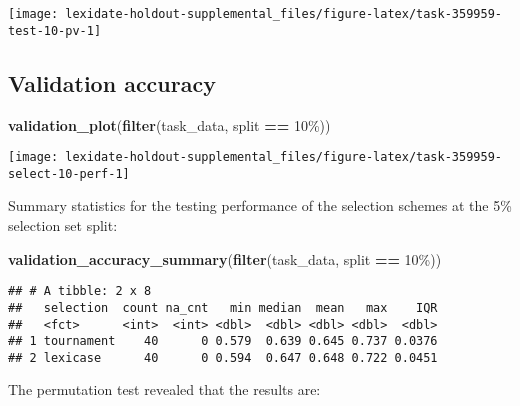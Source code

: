 \documentclass[
]{book}
\newenvironment{Shaded}{\begin{snugshade}}{\end{snugshade}}
\newcommand{\FunctionTok}[1]{\textcolor[rgb]{0.13,0.29,0.53}{\textbf{#1}}}
\newcommand{\NormalTok}[1]{#1}
\newcommand{\SpecialCharTok}[1]{\textcolor[rgb]{0.81,0.36,0.00}{\textbf{#1}}}
\newcommand{\StringTok}[1]{\textcolor[rgb]{0.31,0.60,0.02}{#1}}
\begin{document}
\texttt{[image: lexidate-holdout-supplemental\_files/figure-latex/task-359959-test-10-pv-1]}

\hypertarget{validation-accuracy-36}{%
\subsection{Validation accuracy}\label{validation-accuracy-36}}

\begin{Shaded}
\begin{Highlighting}[]
\FunctionTok{validation\_plot}\NormalTok{(}\FunctionTok{filter}\NormalTok{(task\_data, split }\SpecialCharTok{==} \StringTok{\textquotesingle{}10\%\textquotesingle{}}\NormalTok{))}
\end{Highlighting}
\end{Shaded}

\texttt{[image: lexidate-holdout-supplemental\_files/figure-latex/task-359959-select-10-perf-1]}

Summary statistics for the testing performance of the selection schemes at the 5\% selection set split:

\begin{Shaded}
\begin{Highlighting}[]
\FunctionTok{validation\_accuracy\_summary}\NormalTok{(}\FunctionTok{filter}\NormalTok{(task\_data, split }\SpecialCharTok{==} \StringTok{\textquotesingle{}10\%\textquotesingle{}}\NormalTok{))}
\end{Highlighting}
\end{Shaded}

\begin{verbatim}
## # A tibble: 2 x 8
##   selection  count na_cnt   min median  mean   max    IQR
##   <fct>      <int>  <int> <dbl>  <dbl> <dbl> <dbl>  <dbl>
## 1 tournament    40      0 0.579  0.639 0.645 0.737 0.0376
## 2 lexicase      40      0 0.594  0.647 0.648 0.722 0.0451
\end{verbatim}

The permutation test revealed that the results are:
\end{document}
